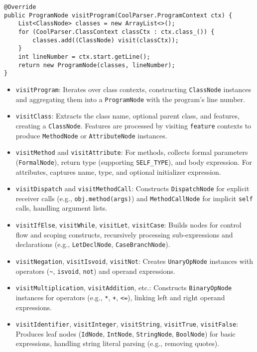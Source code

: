 \documentclass[11pt, titlepage]{article}
\begin{document}
\begin{lstlisting}
@Override
public ProgramNode visitProgram(CoolParser.ProgramContext ctx) {
    List<ClassNode> classes = new ArrayList<>();
    for (CoolParser.ClassContext classCtx : ctx.class_()) {
        classes.add((ClassNode) visit(classCtx));
    }
    int lineNumber = ctx.start.getLine();
    return new ProgramNode(classes, lineNumber);
}
\end{lstlisting}

\begin{itemize}[leftmargin=*]
    \item \texttt{visitProgram}: Iterates over class contexts, constructing \texttt{ClassNode} instances and aggregating them into a \texttt{ProgramNode} with the program's line number.
    \item \texttt{visitClass}: Extracts the class name, optional parent class, and features, creating a \texttt{ClassNode}. Features are processed by visiting \texttt{feature} contexts to produce \texttt{MethodNode} or \texttt{AttributeNode} instances.
    \item \texttt{visitMethod} and \texttt{visitAttribute}: For methods, collects formal parameters (\texttt{FormalNode}), return type (supporting \texttt{SELF\_TYPE}), and body expression. For attributes, captures name, type, and optional initializer expression.
    \item \texttt{visitDispatch} and \texttt{visitMethodCall}: Constructs \texttt{DispatchNode} for explicit receiver calls (e.g., \texttt{obj.method(args)}) and \texttt{MethodCallNode} for implicit \texttt{self} calls, handling argument lists.
    \item \texttt{visitIfElse}, \texttt{visitWhile}, \texttt{visitLet}, \texttt{visitCase}: Builds nodes for control flow and scoping constructs, recursively processing sub-expressions and declarations (e.g., \texttt{LetDeclNode}, \texttt{CaseBranchNode}).
    \item \texttt{visitNegation}, \texttt{visitIsvoid}, \texttt{visitNot}: Creates \texttt{UnaryOpNode} instances with operators (\texttt{\textasciitilde}, \texttt{isvoid}, \texttt{not}) and operand expressions.
    \item \texttt{visitMultiplication}, \texttt{visitAddition}, etc.: Constructs \texttt{BinaryOpNode} instances for operators (e.g., \texttt{*}, \texttt{+}, \texttt{<=}), linking left and right operand expressions.
    \item \texttt{visitIdentifier}, \texttt{visitInteger}, \texttt{visitString}, \texttt{visitTrue}, \texttt{visitFalse}: Produces leaf nodes (\texttt{IdNode}, \texttt{IntNode}, \texttt{StringNode}, \texttt{BoolNode}) for basic expressions, handling string literal parsing (e.g., removing quotes).
\end{itemize}
\end{document}
